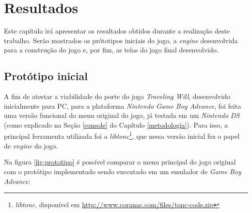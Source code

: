\chapter[Resultados]{Resultados}

Este capítulo irá apresentar os resultados obtidos durante a realização deste trabalho. Serão mostrados os prótotipos iniciais do jogo, a \textit{engine} desenvolvida para a construção do jogo e, por fim, as telas do jogo final desenvolvido.

\section{Protótipo inicial}

A fim de atestar a viabilidade do porte do jogo \textit{Traveling Will}, desenvolvido inicialmente para PC, para a plataforma \textit{Nintendo Game Boy Advance}, foi feita uma versão funcional do menu original do jogo, já testada em um \textit{Nintendo DS} (como explicado na Seção \ref{console} do Capítulo \ref{metodologia}). Para isso, a principal ferramenta utilizada foi a \textit{libtonc}\footnote{\textit{libtonc}, disponível em \url{http://www.coranac.com/files/tonc-code.zip}}, que nessa versão inicial fez o papel de \textit{engine} do jogo.

Na figura \ref{fig:prototipo} é possível comparar o menu principal do jogo original com o protótipo implementado sendo executado em um emulador de \textit{Game Boy Advance}:

